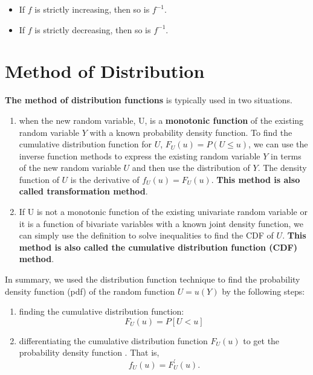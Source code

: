 \documentclass[
]{book}
\begin{document}
\begin{itemize}
\item
  If \(f\) is strictly increasing, then so is \(f^{-1}\).
\item
  If \(f\) is strictly decreasing, then so is \(f^{-1}\).
\end{itemize}

\hypertarget{method-of-distribution}{%
\section{Method of Distribution}\label{method-of-distribution}}

\textbf{The method of distribution functions} is typically used in two situations.

\begin{enumerate}
\def\labelenumi{\arabic{enumi}.}
\item
  when the new random variable, U, is a \textbf{monotonic function} of the existing random variable \(Y\) with a known probability density function. To find the cumulative distribution function for \(U\), \(F_U (u) = P(U \le u)\), we can use the inverse function methods to express the existing random variable \(Y\) in terms of the new random variable \(U\) and then use the distribution of \(Y\). The density function of \(U\) is the derivative of \(f_U(u) = F_U(u)\). \textbf{\color{blue}This method is also called transformation method}.
\item
  If U is not a monotonic function of the existing univariate random variable or it is a function of bivariate variables with a known joint density function, we can simply use the definition to solve inequalities to find the CDF of \(U\). \textbf{\color{blue}This method is also called the cumulative distribution function (CDF) method}.
\end{enumerate}

In summary, we used the distribution function technique to find the probability density function (pdf) of the random function \(U=u(Y)\) by the following steps:

\begin{enumerate}
\def\labelenumi{\arabic{enumi}.}
\item
  finding the cumulative distribution function:
  \[F_U(u) = P[U < u]\]
\item
  differentiating the cumulative distribution function \(F_U(u)\) to get the probability density function . That is, \[f_U(u) = F^\prime_U(u).\]
\end{enumerate}
\end{document}
